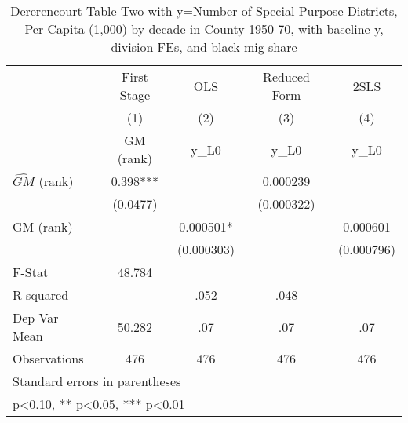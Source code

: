 \begin{table}[htbp]\centering
\def\sym#1{\ifmmode^{#1}\else\(^{#1}\)\fi}
\caption{Dererencourt Table Two with y=Number of Special Purpose Districts, Per Capita (1,000) by decade in County 1950-70, with baseline y, division FEs, and black mig share}
\begin{tabular}{l*{4}{c}}
\toprule
                    & First Stage   &         OLS   &Reduced Form   &        2SLS   \\
                    &\multicolumn{1}{c}{(1)}&\multicolumn{1}{c}{(2)}&\multicolumn{1}{c}{(3)}&\multicolumn{1}{c}{(4)}\\
                    &\multicolumn{1}{c}{GM  (rank)}&\multicolumn{1}{c}{y\_L0}&\multicolumn{1}{c}{y\_L0}&\multicolumn{1}{c}{y\_L0}\\
\midrule
$\hat{GM}$ (rank)   &       0.398***&               &    0.000239   &               \\
                    &    (0.0477)   &               &  (0.000322)   &               \\
\addlinespace
GM  (rank)          &               &    0.000501*  &               &    0.000601   \\
                    &               &  (0.000303)   &               &  (0.000796)   \\
\midrule
F-Stat              &      48.784   &               &               &               \\
R-squared           &               &        .052   &        .048   &               \\
Dep Var Mean        &      50.282   &         .07   &         .07   &         .07   \\
Observations        &         476   &         476   &         476   &         476   \\
\bottomrule
\multicolumn{5}{l}{\footnotesize Standard errors in parentheses}\\
\multicolumn{5}{l}{\footnotesize * p<0.10, ** p<0.05, *** p<0.01}\\
\end{tabular}
\end{table}
